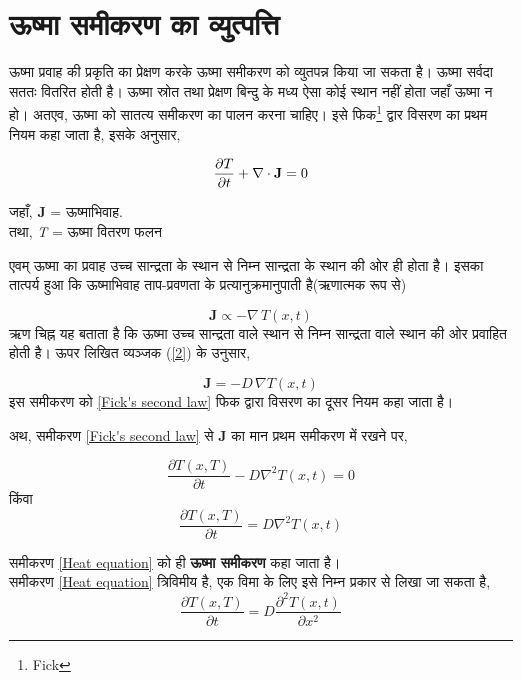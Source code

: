 \documentclass[10pt,a4paper,twoside]{article}
\begin{document}
 



\section{ऊष्मा समीकरण का व्युत्पत्ति}
ऊष्मा प्रवाह की प्रकृति का प्रेक्षण करके ऊष्मा समीकरण को व्युतपन्न किया जा सकता है। ऊष्मा सर्वदा सततः वितरित होती है। ऊष्मा स्रोत तथा प्रेक्षण बिन्दु के मध्य ऐसा कोई स्थान नहीं होता जहाँ ऊष्मा न हो। अतएव, ऊष्मा को सातत्य समीकरण का पालन करना चाहिए। इसे फिक\footnote{Fick} द्वार विसरण का प्रथम नियम कहा जाता है, इसके अनुसार,

\begin{equation}
    \frac{\partial T}{\partial t} + \nabla \cdot \textbf J = 0
\end{equation} 

    
जहाँ,\hspace{3cm}  $\textbf{J}$ = ऊष्माभिवाह. \\
तथा,   \hspace{33mm} \textit{T} = ऊष्मा वितरण फलन


एवम् ऊष्मा का प्रवाह उच्च सान्द्रता के स्थान से निम्न सान्द्रता के स्थान की ओर ही होता है। इसका तात्पर्य हुआ कि ऊष्माभिवाह ताप-प्रवणता के प्रत्यानुक्रमानुपाती है(ऋणात्मक रूप से)

\begin{equation}
    \textbf{J} \propto - \nabla \, T(x,t) \label{2} 
\end{equation}
ऋण चिह्न यह बताता है कि ऊष्मा उच्च सान्द्रता वाले स्थान से निम्न सान्द्रता वाले स्थान की ओर प्रवाहित होती है।
ऊपर लिखित व्यञ्जक (\ref{2}) के उनुसार, 

\begin{equation}
    \textbf{J} = -D \, \nabla T(x,t) \label{Fick's second law}
\end{equation}
इस समीकरण को \ref{Fick's second law} फिक द्वारा विसरण का दूसर नियम कहा जाता है।


अथ, समीकरण \ref{Fick's second law} से \textbf{J} का मान प्रथम समीकरण में रखने पर, 

\begin{equation}
    \frac{\partial T(x,T)}{\partial t} - D \nabla^2 T(x,t) = 0
\end{equation}
किंवा
\begin{equation}
    \frac{\partial T(x,T)}{\partial t} = D \nabla^2 T(x,t) \label{Heat equation}
\end{equation}

समीकरण \ref{Heat equation} को ही \textbf{ऊष्मा समीकरण} कहा जाता है। 
\\
समीकरण \ref{Heat equation} त्रिविमीय है, एक विमा के लिए इसे निम्न प्रकार से लिखा जा सकता है, 
\begin{equation}
    \frac{\partial T(x,T)}{\partial t} = D \frac{\partial^2 T(x,t)}{\partial x^2}
\end{equation}
\end{document}
